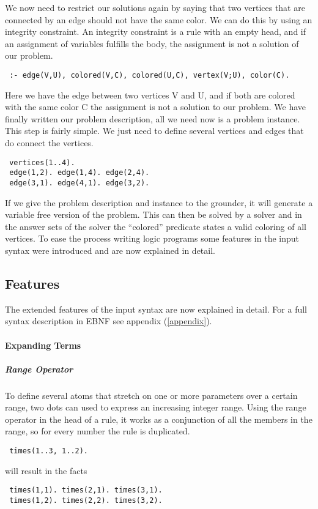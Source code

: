 \documentclass[a4paper,10pt]{article}
\begin{document}
We now need to restrict our solutions again by saying that two vertices that are connected by an edge should not have the same color.
We can do this by using an integrity constraint.
An integrity constraint is a rule with an empty head, and if an assignment of variables fulfills the body, the assignment is not a solution of our problem.
\begin{verbatim}
 :- edge(V,U), colored(V,C), colored(U,C), vertex(V;U), color(C).
\end{verbatim}
Here we have the edge between two vertices V and U, and if both are colored with the same color C the assignment is not a solution to our problem.
\newline
We have finally written our problem description, all we need now is a problem instance. This step is fairly simple.
We just need to define several vertices and edges that do connect the vertices.
\begin{verbatim}
 vertices(1..4).
 edge(1,2). edge(1,4). edge(2,4).
 edge(3,1). edge(4,1). edge(3,2).
\end{verbatim}

If we give the problem description and instance to the grounder, it will generate a variable free version of the problem. This can then be solved by a solver and in the answer sets of the solver the ``colored'' predicate states a valid coloring of all vertices.
\newline
To ease the process writing logic programs some features in the input syntax were introduced and are now explained in detail.
\subsection{Features}
The extended features of the input syntax are now explained in detail. For a full syntax description in EBNF see appendix (\ref{appendix}).
\paragraph{Expanding Terms}
\subparagraph{Range Operator}
To define several atoms that stretch on one or more parameters over a certain range, two dots can used to express an increasing integer range.
Using the range operator in the head of a rule, it works as a conjunction of all the members in the range, so for every number the rule is duplicated.
\begin{verbatim}
 times(1..3, 1..2).
\end{verbatim}
will result in the facts
\begin{verbatim}
 times(1,1). times(2,1). times(3,1).
 times(1,2). times(2,2). times(3,2).
\end{verbatim}
\end{document}
